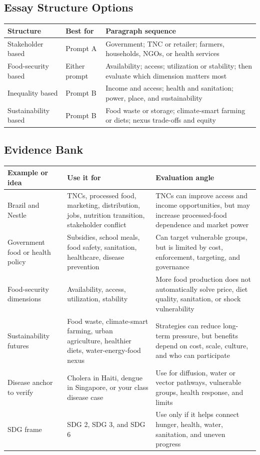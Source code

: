 \documentclass[11pt,a4paper]{article}
\begin{document}
\subsection{Essay Structure Options}

\begin{tabularx}{\textwidth}{L{0.2\textwidth}Y Y}
\toprule
\textbf{Structure} & \textbf{Best for} & \textbf{Paragraph sequence} \\
\midrule
Stakeholder based & Prompt A & Government; TNC or retailer; farmers,
households, NGOs, or health services \\
Food-security based & Either prompt & Availability; access; utilization or
stability; then evaluate which dimension matters most \\
Inequality based & Prompt B & Income and access; health and sanitation; power,
place, and sustainability \\
Sustainability based & Prompt B & Food waste or storage; climate-smart farming
or diets; nexus trade-offs and equity \\
\bottomrule
\end{tabularx}

\subsection{Evidence Bank}

\begin{tabularx}{\textwidth}{L{0.2\textwidth}Y Y}
\toprule
\textbf{Example or idea} & \textbf{Use it for} & \textbf{Evaluation angle} \\
\midrule
Brazil and Nestle & TNCs, processed food, marketing, distribution, jobs,
nutrition transition, stakeholder conflict & TNCs can improve access and
income opportunities, but may increase processed-food dependence and market
power \\
Government food or health policy & Subsidies, school meals, food safety,
sanitation, healthcare, disease prevention & Can target vulnerable groups, but
is limited by cost, enforcement, targeting, and governance \\
Food-security dimensions & Availability, access, utilization, stability &
More food production does not automatically solve price, diet quality,
sanitation, or shock vulnerability \\
Sustainability futures & Food waste, climate-smart farming, urban agriculture,
healthier diets, water-energy-food nexus & Strategies can reduce long-term
pressure, but benefits depend on cost, scale, culture, and who can participate \\
Disease anchor to verify & Cholera in Haiti, dengue in Singapore, or your
class disease case & Use for diffusion, water or vector pathways, vulnerable
groups, health response, and limits \\
SDG frame & SDG 2, SDG 3, and SDG 6 & Use only if it helps connect hunger,
health, water, sanitation, and uneven progress \\
\bottomrule
\end{tabularx}
\end{document}
